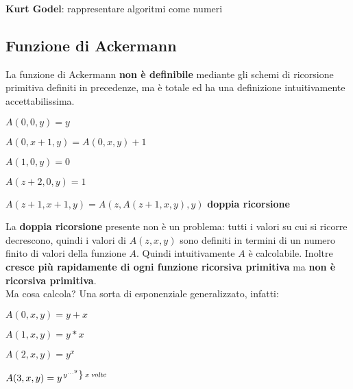 \documentclass[10pt]{book}
\begin{document}
\textbf{Kurt Godel}: rappresentare algoritmi come numeri
\subsection{Funzione di Ackermann}
La funzione di Ackermann \textbf{non è definibile} mediante gli schemi di ricorsione primitiva definiti in precedenze, ma è totale ed ha una definizione intuitivamente accettabilissima.

\begin{list}{}{}
	\item $A(0, 0, y) = y$
	\item $A(0, x + 1, y) = A(0, x, y) + 1$
	\item $A(1, 0, y) = 0$
	\item $A(z + 2, 0, y) = 1$
	\item $A(z + 1, x + 1, y) = A(z, A(z + 1, x, y), y)$ \textbf{doppia ricorsione}

\end{list}
La \textbf{doppia ricorsione} presente non è un problema: tutti i valori su cui si ricorre decrescono, quindi i valori di $A(z, x, y)$ sono definiti in termini di un numero finito di valori della funzione $A$. Quindi intuitivamente $A$ è calcolabile. Inoltre \textbf{cresce più rapidamente di ogni funzione ricorsiva primitiva} ma \textbf{non è ricorsiva primitiva}.\\
Ma cosa calcola? Una sorta di esponenziale generalizzato, infatti:
\begin{list}{}{}
	\item $A(0, x, y) = y + x$
	\item $A(1, x, y) = y * x$
	\item $A(2, x, y) = y^x$
	\item $A(3, x, y) = y^{\left.y^{\ldots^y}\right\} \:x\:\textsl{volte}}$
\end{list}
\end{document}
